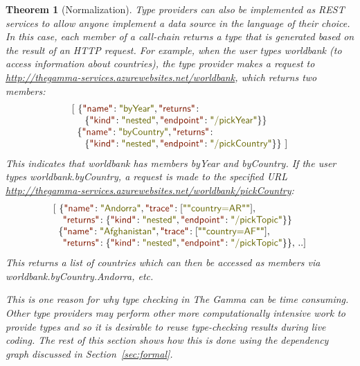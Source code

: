 \documentclass[acmsmall,anonymous,fleqn]{acmart}\settopmatter{printfolios=false,printccs=false,printacmref=false}
\newcounter{thc}
\theoremstyle{plain}
\newtheorem{theorem}[thc]{Theorem}
\theoremstyle{definition}
\newcommand{\str}[1]{\textnormal{\textcolor{strclr}{\sffamily "#1"}}}
\newcommand{\rstr}[1]{\textnormal{\textcolor{rstrclr}{\sffamily "#1"}}}
\newcommand{\ident}[1]{\textnormal{\textcolor{idclr}{\sffamily #1}}}
\begin{document}
\begin{theorem}[Normalization]
Type providers can also be implemented as REST services \cite{rest} to allow anyone implement a data source
in the language of their choice. In this case, each member of a call-chain returns a type that is
generated based on the result of an HTTP request. For example, when the user types \ident{worldbank}
(to access information about countries), the type provider makes a request to
\url{http://thegamma-services.azurewebsites.net/worldbank}, which returns two members:
%
\begin{equation*}
\begin{array}{l}
[~\{\rstr{name}\!:\str{byYear},\rstr{returns}\!:\\
~\quad \{\rstr{kind}\!:\str{nested},\rstr{endpoint}\!:\str{/pickYear}\}\}\\
\hspace{0.55em}\{\rstr{name}\!:\str{byCountry},\rstr{returns}\!:\\
~\quad \{\rstr{kind}\!:\str{nested},\rstr{endpoint}\!:\str{/pickCountry}\}\}~]
\end{array}
\end{equation*}
%
This indicates that \ident{worldbank} has members \ident{byYear} and \ident{byCountry}.
If the user types \ident{worldbank.byCountry}, a request is made to the specified URL
\url{http://thegamma-services.azurewebsites.net/worldbank/pickCountry}:
%
\begin{equation*}
\begin{array}{l}
[~\{\rstr{name}\!:\str{Andorra},\rstr{trace}\!:[\str{"country=AR"}], \\
\quad \rstr{returns}\!:\{\rstr{kind}\!:\str{nested},\rstr{endpoint}\!:\str{/pickTopic}\}\}\\
\hspace{0.55em}\{\rstr{name}\!:\str{Afghanistan},\rstr{trace}\!:[\str{"country=AF"}],\\
\quad \rstr{returns}\!:\{\rstr{kind}\!:\str{nested},\rstr{endpoint}\!:\str{/pickTopic}\}\},\,..]
\end{array}
\end{equation*}
%
This returns a list of countries which can then be accessed as members via
\ident{worldbank.byCountry.Andorra}, etc.

This is one reason for why type checking in The Gamma can be time consuming. Other
type providers may perform other more computationally intensive work to provide types and so
it is desirable to reuse type-checking results during live coding. The rest of this section
shows how this is done using the dependency graph discussed in Section~\ref{sec:formal}.


\end{theorem}
\end{document}
